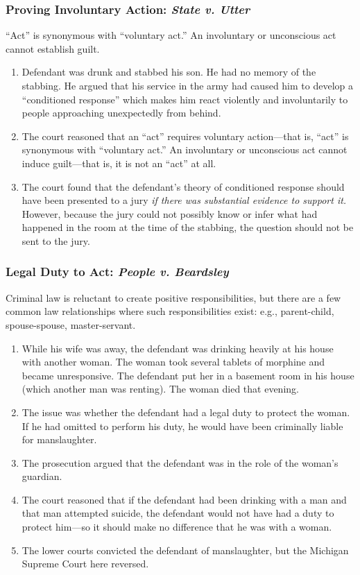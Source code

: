 \subsubsection{Proving Involuntary Action: \emph{State v. Utter}}

``Act'' is synonymous with ``voluntary act.'' An involuntary or unconscious 
act cannot establish guilt.

\begin{enumerate}
    \item Defendant was drunk and stabbed his son. He had no memory of the 
    stabbing. He argued that his service in the army had caused him to develop 
    a ``conditioned response'' which makes him react violently and 
    involuntarily to people approaching unexpectedly from behind.
    \item The court reasoned that an ``act'' requires voluntary action---that 
    is, ``act'' is synonymous with ``voluntary act.'' An involuntary or 
    unconscious act cannot induce guilt---that is, it is not an ``act'' at 
    all.
    \item The court found that the defendant's theory of conditioned response 
    should have been presented to a jury \emph{if there was substantial 
    evidence to support it.} However, because the jury could not possibly know 
    or infer what had happened in the room at the time of the stabbing, the 
    question should not be sent to the jury.
\end{enumerate}

\subsubsection{Legal Duty to Act: \emph{People v. Beardsley}}

Criminal law is reluctant to create positive responsibilities, but there are a 
few common law relationships where such responsibilities exist: e.g., 
parent-child, spouse-spouse, master-servant.

\begin{enumerate}
    \item While his wife was away, the defendant was drinking heavily at his 
    house with another woman. The woman took several tablets of morphine and 
    became unresponsive. The defendant put her in a basement room in his house 
    (which another man was renting). The woman died that evening.
    \item The issue was whether the defendant had a legal duty to protect the 
    woman. If he had omitted to perform his duty, he would have been 
    criminally liable for manslaughter.
    \item The prosecution argued that the defendant was in the 
    role of the woman's guardian.
    \item The court reasoned that if the defendant had been drinking with a 
    man and that man attempted suicide, the defendant would not have had a 
    duty to protect him---so it should make no difference that he was with a 
    woman.
    \item The lower courts convicted the defendant of manslaughter, but the 
    Michigan Supreme Court here reversed.
\end{enumerate}

